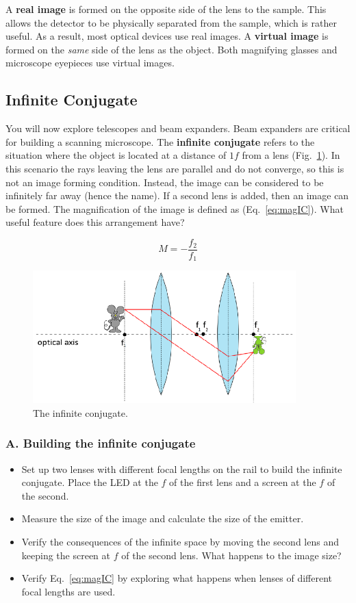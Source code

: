 \documentclass[a4paper]{report}
\begin{document}
A \textbf{real image} is formed on the opposite side of the lens to the sample. 
This allows the detector to be physically separated from the sample, which is rather useful.
As a result, most optical devices use real images. 
A \textbf{virtual image} is formed on the \textit{same} side of the lens as the object. 
Both magnifying glasses and microscope eyepieces use virtual images. 


\clearpage

\subsection{Infinite Conjugate}
You will now explore telescopes and beam expanders.
Beam expanders are critical for building a scanning microscope.
The \textbf{infinite conjugate} refers to the situation where the
object is located at a distance of $1f$ from a lens
(Fig.~\ref{infiniteConjugate}). In this scenario the rays leaving the
lens are parallel and do not converge, so this is not an image forming
condition. Instead, the image can be considered to be infinitely far
away (hence the name). If a second lens is added, then an image can
be formed. The magnification of the image is defined as
(Eq.~\ref{eq:magIC}). 
What useful feature does this arrangement have? 

\begin{equation}
M=-\frac{f_2}{f_1}
\label{eq:magIC}
\end{equation}

\begin{figure}[h]
\center
\includegraphics[width=4in]{infiniteConjugate.eps}
\caption{The infinite conjugate.}
\label{infiniteConjugate}
\end{figure}
\subsubsection{A. Building the infinite conjugate}
\begin{itemize}
\item Set up two lenses with different focal lengths on the rail to build the infinite conjugate. 
Place the LED at the $f$ of the first lens and a screen at the $f$ of the second. 
\item Measure the size of the image and calculate the size of the emitter. 
\item Verify the consequences of the infinite space by moving the second lens and keeping the screen at $f$ of the second lens. 
What happens to the image size?
\item Verify Eq.~\ref{eq:magIC} by exploring what happens when lenses of different focal lengths are used. 
\end{itemize}
\end{document}

